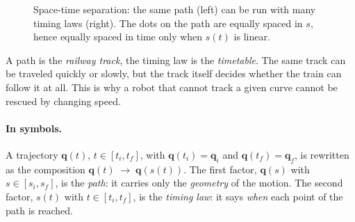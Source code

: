 \documentclass[11pt,a4paper]{article}
\newcommand{\q}{\boldsymbol{q}}
\newcommand{\qi}{\boldsymbol{q}_i}
\newcommand{\qf}{\boldsymbol{q}_f}
\theoremstyle{definition}
\theoremstyle{plain}
\theoremstyle{remark}
\begin{document}
\begin{figure}[h]
\centering
{}
\caption{Space-time separation: the same path (left) can be run with many timing laws (right). The dots on the path
are equally spaced in $s$, hence equally spaced in time only when $s(t)$ is linear.}
\end{figure}

\begin{intuition}
A path is the \emph{railway track}, the timing law is the \emph{timetable}. The same track can be traveled quickly or
slowly, but the track itself decides whether the train can follow it at all. This is why a robot that cannot track a given
curve cannot be rescued by changing speed.
\end{intuition}

\paragraph{In symbols.} A trajectory $\q(t)$, $t\in[t_i,t_f]$, with $\q(t_i)=\qi$ and $\q(t_f)=\qf$, is rewritten as the
composition $\q(t)\;\to\;\q(s(t))$. The first factor, $\q(s)$ with $s\in[s_i,s_f]$, is the \emph{path}: it carries only the
\emph{geometry} of the motion. The second factor, $s(t)$ with $t\in[t_i,t_f]$, is the \emph{timing law}: it says \emph{when} each
point of the path is reached.
\end{document}
